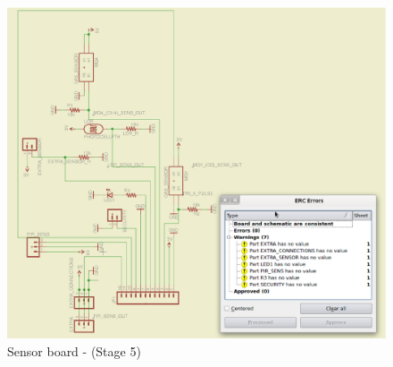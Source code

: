 \documentclass[12pt,a4paper,draft]{report}
\begin{document}
\begin{figure}[H]
\centering
\includegraphics*[scale=0.25]{sens_brd_s5}
\caption{Sensor board -  (Stage 5)}
\label{Sensor-brd-s5}
\end{figure}
\ \\
%
\end{document}
